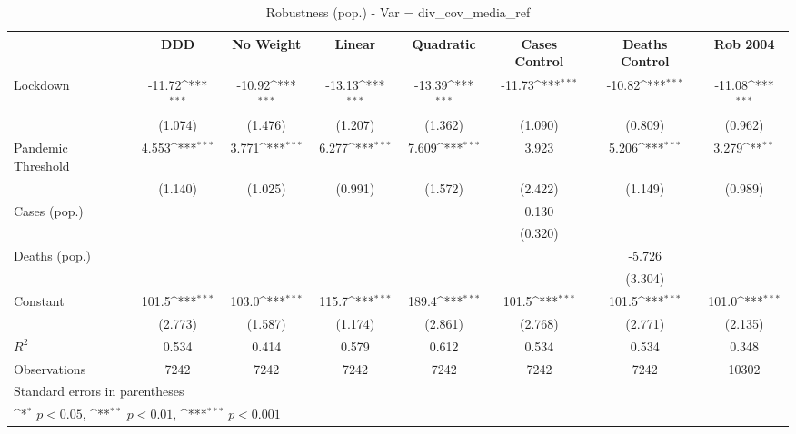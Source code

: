 \documentclass{article}
\begin{document}
{
\def\sym#1{\ifmmode^{#1}\else\(^{#1}\)\fi}
\begin{longtable}{l*{7}{c}}
\caption{Robustness (pop.) - Var = div\_cov\_media\_ref}\\
\hline\hline\endfirsthead\hline\endhead\hline\endfoot\endlastfoot
                &\multicolumn{1}{c}{DDD}&\multicolumn{1}{c}{No Weight}&\multicolumn{1}{c}{Linear}&\multicolumn{1}{c}{Quadratic}&\multicolumn{1}{c}{Cases Control}&\multicolumn{1}{c}{Deaths Control}&\multicolumn{1}{c}{Rob 2004}\\
\hline
Lockdown        &   -11.72\sym{***}&   -10.92\sym{***}&   -13.13\sym{***}&   -13.39\sym{***}&   -11.73\sym{***}&   -10.82\sym{***}&   -11.08\sym{***}\\
                &  (1.074)         &  (1.476)         &  (1.207)         &  (1.362)         &  (1.090)         &  (0.809)         &  (0.962)         \\
Pandemic Threshold&    4.553\sym{***}&    3.771\sym{***}&    6.277\sym{***}&    7.609\sym{***}&    3.923         &    5.206\sym{***}&    3.279\sym{**} \\
                &  (1.140)         &  (1.025)         &  (0.991)         &  (1.572)         &  (2.422)         &  (1.149)         &  (0.989)         \\
Cases (pop.)    &                  &                  &                  &                  &    0.130         &                  &                  \\
                &                  &                  &                  &                  &  (0.320)         &                  &                  \\
Deaths (pop.)   &                  &                  &                  &                  &                  &   -5.726         &                  \\
                &                  &                  &                  &                  &                  &  (3.304)         &                  \\
Constant        &    101.5\sym{***}&    103.0\sym{***}&    115.7\sym{***}&    189.4\sym{***}&    101.5\sym{***}&    101.5\sym{***}&    101.0\sym{***}\\
                &  (2.773)         &  (1.587)         &  (1.174)         &  (2.861)         &  (2.768)         &  (2.771)         &  (2.135)         \\
\hline
\(R^{2}\)       &    0.534         &    0.414         &    0.579         &    0.612         &    0.534         &    0.534         &    0.348         \\
Observations    &     7242         &     7242         &     7242         &     7242         &     7242         &     7242         &    10302         \\
\hline\hline
\multicolumn{8}{l}{\footnotesize Standard errors in parentheses}\\
\multicolumn{8}{l}{\footnotesize \sym{*} \(p<0.05\), \sym{**} \(p<0.01\), \sym{***} \(p<0.001\)}\\
\end{longtable}
}
\end{document}
